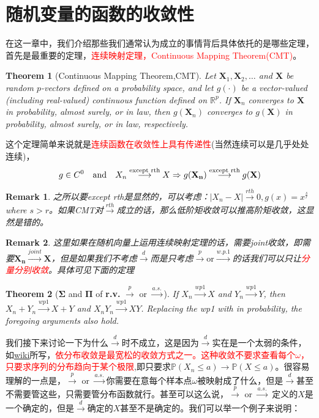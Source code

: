 \documentclass{article}
\newtheorem{theorem}{Theorem}[section]
\newtheorem{remark}{Remark}[theorem]
\begin{document}
\section{随机变量的函数的收敛性}
在这一章中，我们介绍那些我们通常认为成立的事情背后具体依托的是哪些定理，首先是最重要的定理，\textcolor{red}{连续映射定理，Continuous Mapping Theorem(CMT)}。
\begin{theorem}[Continuous Mapping Theorem,CMT]
	Let $\mathbf{X}_1, \mathbf{X}_2, \ldots$ and $\mathbf{X}$ be random $p$-vectors defined on a probability space, and let $g(\cdot)$ be a vector-valued (including real-valued) continuous function defined on $\mathbb{R}^p$. If $\mathbf{X}_n$ converges to $\mathbf{X}$ in probability, almost surely, or in law, then $g\left(\mathbf{X}_n\right)$ converges to $g(\mathbf{X})$ in probability, almost surely, or in law, respectively.
\end{theorem}
这个定理简单来说就是\textcolor{red}{连续函数在收敛性上具有传递性}(当然连续可以是几乎处处连续)，
\begin{equation*}
	g \in C^0 \text{\quad and\quad} X_n \stackrel{\text{except rth}}{\longrightarrow} X \Rightarrow g(\mathbf{X_n})\stackrel{\text{except rth}}{\longrightarrow}g(\mathbf{X})
\end{equation*}
\begin{remark}
	之所以要except rth是显然的，可以考虑：$|X_n-X|\stackrel{rth}{\rightarrow}0,g(x)=x^{\frac{s}{r}}$ where $s>r$。如果CMT对$\stackrel{rth}{\rightarrow}$成立的话，那么低阶矩收敛可以推高阶矩收敛，这显然是错的。
\end{remark}
\begin{remark}
	这里如果在随机向量上运用连续映射定理的话，需要joint收敛，即需要$\bm{X_n}\stackrel{joint}{\rightarrow}  \bm{X}$，但是如果我们不考虑$\stackrel{d}{\rightarrow}$而是只考虑$\stackrel{p}{\rightarrow}\text{or} \stackrel{w.p.1}{\rightarrow}$的话我们可以只让\textcolor{red}{分量分别收敛}。具体可见下面的定理
\end{remark}
\begin{theorem}[$\bm{\Sigma}$ and $\bm{\Pi}$ of \textbf{r.v.} $\stackrel{p}{\rightarrow}$ or $\stackrel{a.s.}{\rightarrow}$]
	If $X_n \stackrel{w p 1}{\rightarrow} X$ and $Y_n \stackrel{w p 1}{\rightarrow} Y$, then $X_n+Y_n \stackrel{w p 1}{\rightarrow} X+Y$ and $X_n Y_n \stackrel{w p 1}{\rightarrow} X Y$. Replacing the wp1 with in probability, the foregoing arguments also hold.
\end{theorem}
我们接下来讨论一下为什么$\stackrel{d}{\rightarrow}$时不成立，这是因为$\stackrel{d}{\rightarrow}$实在是一个太弱的条件，如\href{https://zh.wikipedia.org/wiki/%E9%9A%8F%E6%9C%BA%E5%8F%98%E9%87%8F%E7%9A%84%E6%94%B6%E6%95%9B#%E4%BE%9D%E5%88%86%E5%B8%83%E6%94%B6%E6%95%9B}{wiki}所写，\textcolor{red}{依分布收敛是最宽松的收敛方式之一。这种收敛不要求查看每个$\omega$，只要求序列的分布趋向于某个极限},即只要求$\mathbb{P}\left(X_n \leqslant a\right) \rightarrow \mathbb{P}(X \leqslant a)$。很容易理解的一点是，$\stackrel{p}{\rightarrow}$ or $\stackrel{a.s.}{\rightarrow}$你需要在意每个样本点$\omega$被映射成了什么，但是$\stackrel{d}{\rightarrow}$甚至不需要管这些，只需要管分布函数就行。甚至可以这么说，$\stackrel{p}{\rightarrow}$ or $\stackrel{a.s.}{\rightarrow}$ 定义的$X$是一个确定的，但是$\stackrel{d}{\rightarrow}$确定的$X$甚至不是确定的。我们可以举一个例子来说明：
\end{document}
